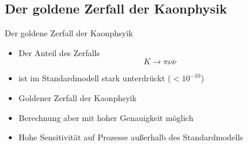 \documentclass[aspectratio=1610, professionalfonts, 9pt, t]{beamer}
\begin{document}
  \subsection{Der goldene Zerfall der Kaonphysik}

  \begin{frame}{Der goldene Zerfall der Kaonphsyik}
    \begin{itemize}
      \item Der Anteil des Zerfalls
      \begin{equation*}
        K \rightarrow \pi \nu \bar{\nu}
      \end{equation*}
      \item[] ist im Standardmodell stark unterdrückt ($<10^{-10}$)
      \item[\rightarrow] Goldener Zerfall der Kaonphsyik
      \item Berechnung aber mit hoher Genauigkeit möglich
      \item[\rightarrow] Hohe Sensitivität auf Prozesse außerhalb des Standardmodells
    \end{itemize}
  \end{frame}
\end{document}
